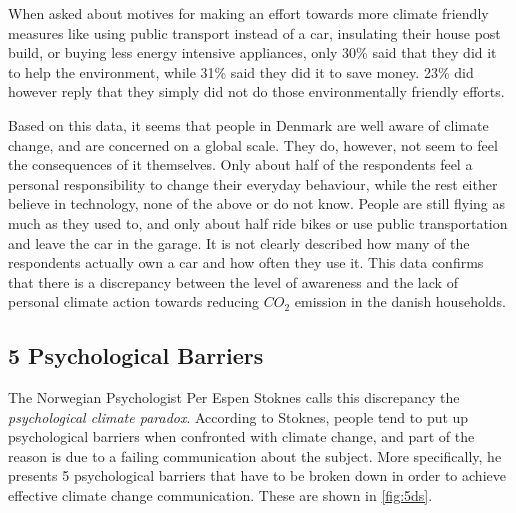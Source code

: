         When asked about motives for making an effort towards more climate friendly measures like using public transport instead of a car, insulating their house post build, or buying less energy intensive appliances, only 30\% said that they did it to help the environment, while 31\% said they did it to save money. 23\% did however reply that they simply did not do those environmentally friendly efforts\cite{concito}.
        
        Based on this data, it seems that people in Denmark are well aware of climate change, and are concerned on a global scale. They do, however, not seem to feel the consequences of it themselves. Only about half of the respondents feel a personal responsibility to change their everyday behaviour, while the rest either believe in technology, none of the above or do not know. People are still flying as much as they used to, and only about half ride bikes or use public transportation and leave the car in the garage. It is not clearly described how many of the respondents actually own a car and how often they use it. This data confirms that there is a discrepancy between the level of awareness and the lack of personal climate action towards reducing $CO_2$ emission in the danish households.
    
    \subsection{5 Psychological Barriers}
        The Norwegian Psychologist Per Espen Stoknes calls this discrepancy the \textit{psychological climate paradox}\cite{storyAboutClimateChange, the5Ds}. According to Stoknes, people tend to put up psychological barriers when confronted with climate change, and part of the reason is due to a failing communication about the subject. More specifically, he presents 5 psychological barriers that have to be broken down in order to achieve effective climate change communication. These are shown in \autoref{fig:5ds}.
        
